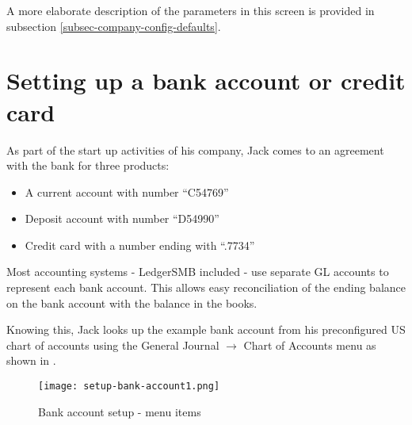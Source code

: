 
A more elaborate description of the parameters in this screen is provided in subsection
\ref{subsec-company-config-defaults}.

\section{Setting up a bank account or credit card}
\label{sec-first-login-setup-bank-account}

As part of the start up activities of his company, Jack comes to an agreement with the
bank for three products:

\begin{itemize}
\item A current account with number ``C54769''
\item Deposit account with number ``D54990''
\item Credit card with a number ending with ``.7734''
\end{itemize}

Most accounting systems - LedgerSMB included - use separate GL accounts to represent
each bank account. This allows easy reconciliation of the ending balance on the bank
account with the balance in the books.

Knowing this, Jack looks up the example bank account from his preconfigured US chart of
accounts using the General Journal $\rightarrow$ Chart of Accounts menu as
shown in .

\begin{figure}[h]
\texttt{[image: setup-bank-account1.png]}
\caption{Bank account setup - menu items}
\label{fig:bank-setup1}
\end{figure}

